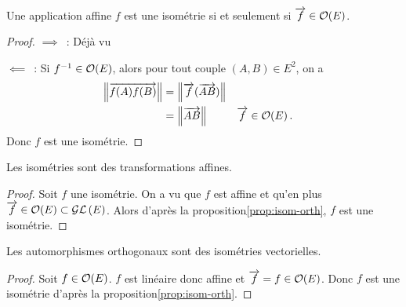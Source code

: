 \begin{prop}
  \label{prop:isom-orth}
  Une application affine \(f\) est une isométrie si et seulement si \(\overrightarrow{f} 
  \in \mathcal{O}\!\left(E\right)\).
\end{prop}
\begin{proof}
  \(\implies\)~: Déjà vu

  \(\impliedby\)~: Si \(f^{-1} \in \mathcal{O}\!\left(E\right)\), alors pour tout couple \((A,B) 
  \in E^2\), on a
  \begin{align*}
    \left\lVert\overrightarrow{f(A)f(B)}\right\rVert &= \left\lVert\overrightarrow{f}(\overrightarrow{AB})\right\rVert \\
    &=\left\lVert\overrightarrow{AB}\right\rVert && \overrightarrow{f} \in \mathcal{O}\!\left(E\right).
  \end{align*}
  Donc \(f\) est une isométrie.
\end{proof}

\begin{prop}
  Les isométries sont des transformations affines.
\end{prop}
\begin{proof}
  Soit \(f\) une isométrie. On a vu que \(f\) est affine et qu'en plus 
  \(\overrightarrow{f} \in \mathcal{O}\!\left(E\right) \subset \mathcal{GL}\left(E\right)\). Alors d'après la proposition\ref{prop:isom-orth}, \(f\) est une isométrie.
\end{proof}

\begin{prop}
  Les automorphismes orthogonaux sont des isométries vectorielles.
\end{prop}
\begin{proof}
  Soit \(f \in \mathcal{O}\!\left(E\right)\). \(f\) est linéaire donc affine et \(\overrightarrow{f}=f \in 
  \mathcal{O}\!\left(E\right)\). Donc \(f\) est une isométrie d'après la proposition\ref{prop:isom-orth}.
\end{proof}

